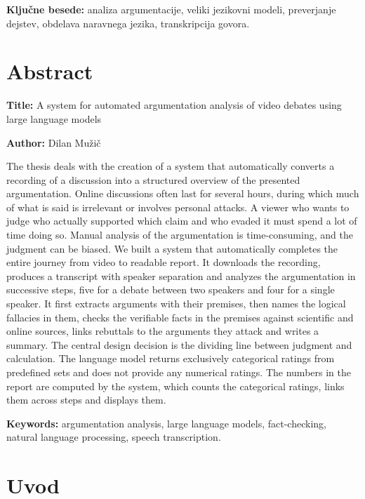 \documentclass[a4paper, 12pt]{book}
\newcommand{\ttitleEn}{A system for automated argumentation analysis of video debates using large language models}
\newcommand{\tauthor}{Dilan Mužič}
\newcommand{\tkeywords}{analiza argumentacije, veliki jezikovni modeli, preverjanje dejstev, obdelava naravnega jezika, transkripcija govora}
\newcommand{\tkeywordsEn}{argumentation analysis, large language models, fact-checking, natural language processing, speech transcription}
\newcommand{\clearemptydoublepage}{\newpage{\pagestyle{empty}\cleardoublepage}}
\begin{document}
\bigskip

\noindent\textbf{Ključne besede:} \tkeywords.
\clearemptydoublepage

\chapter*{Abstract}

\noindent\textbf{Title:} \ttitleEn
\bigskip

\noindent\textbf{Author:} \tauthor
\bigskip

\noindent
The thesis deals with the creation of a system that automatically converts a recording of a discussion into a structured overview of the presented argumentation. Online discussions often last for several hours, during which much of what is said is irrelevant or involves personal attacks. A viewer who wants to judge who actually supported which claim and who evaded it must spend a lot of time doing so. Manual analysis of the argumentation is time-consuming, and the judgment can be biased. We built a system that automatically completes the entire journey from video to readable report. It downloads the recording, produces a transcript with speaker separation and analyzes the argumentation in successive steps, five for a debate between two speakers and four for a single speaker. It first extracts arguments with their premises, then names the logical fallacies in them, checks the verifiable facts in the premises against scientific and online sources, links rebuttals to the arguments they attack and writes a summary. The central design decision is the dividing line between judgment and calculation. The language model returns exclusively categorical ratings from predefined sets and does not provide any numerical ratings. The numbers in the report are computed by the system, which counts the categorical ratings, links them across steps and displays them.

\bigskip

\noindent\textbf{Keywords:} \tkeywordsEn.
\clearemptydoublepage

\mainmatter
\setcounter{page}{1}
\pagestyle{fancy}


\chapter{Uvod}
\label{ch:uvod}
\end{document}
